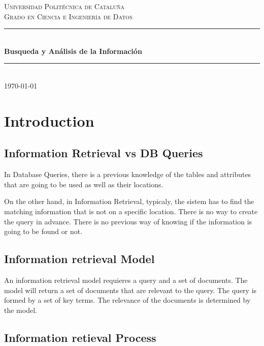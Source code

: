 \documentclass{article}
\begin{document}
\begin{titlepage}
    \newcommand{\HRule}{\rule{\linewidth}{0.5mm}}
    
    \center %
    \textsc{\LARGE Universidad Politécnica de Cataluña}\\[1.5cm]
    \textsc{\Large Grado en Ciencia e Ingeniería de Datos}\\[0.5cm]
    \HRule\\[0.4cm]
    {\huge\bfseries Busqueda y Análisis de la Información}\\[0.4cm]
    \HRule\\[1.5cm]
    \vfill
    {\large\today}
\end{titlepage}

\newpage
\tableofcontents
\newpage

\fancyfoot{} %

\section{Introduction}

\subsection{Information Retrieval vs DB Queries}
In Database Queries, there is a previous knowledge of the tables and attributes that are going to be used as well as their locations.

On the other hand, in Information Retrieval, typicaly, the sistem has to find the matching information that is not on a specific location. There is no way to create the query in advance. There is no previous way of knowing if the information is going to be found or not.


\subsection{Information retrieval Model}
An information retrieval model requieres a query and a set of documents. The model will return a set of documents that are relevant to the query. The query is formed by a set of key terms. The relevance of the documents is determined by the model.

\subsection{Information retieval Process}
\end{document}
